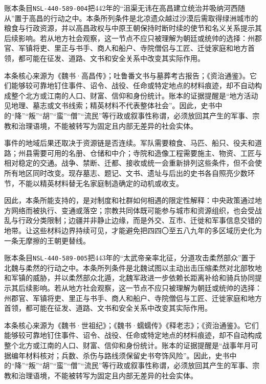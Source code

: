 账本条目\texttt{NSL-440-589-004}把442年的“沮渠无讳在高昌建立统治并吸纳河西随从”置于高昌的行动之中。本条所列条件是北凉遗众越过沙漠后需取得绿洲城市的粮食与行政资源，并以高昌政权与中原王朝保持时断时续的使节和名义关系提示其后续影响。若从地方社会观察，这一节点不应只被理解为朝廷或统帅的选择：州郡官、军镇将吏、里正与书手、商人和船户、寺院僧侣与工匠、迁徙家庭和地方首领，都可能在征发、道路、文书和安全关系中改变其实际作用。

本条核心来源为《魏书·高昌传》；吐鲁番文书与墓葬考古报告；《资治通鉴》。它们能够较可靠地钉住事件、诏令、战役、任命或特定地点的材料痕迹，却不自动构成整个北方或江南的人口、财富、信仰和身份统计。账本的证据提醒是“地方活动见地理、墓志或文书线索；精英材料不代表整体社会”。因此，史书中的“降”“叛”“胡”“蛮”“僧”“流民”等行政或叙事性称谓，必须放回其产生的军事、宗教和治理语境，不能被转写为固定且内部无差异的社会实体。

事件的地域后果还取决于资源链是否连续。军队需要粮食、马匹、船只、役夫和道路；州县需要可用的名册、仓储和中介；寺院和造像工程需要施主、物资、工匠与相对稳定的交通。战争、禁断、迁都、接收或统一会重新排列这些条件，但不会使所有地区同时改变。现存墓志、题记、文书、遗址与后出的史书各自照亮少数环节，不能以精英材料替无名家庭制造确定的动机或收支。

因此，本条所能支持的，是对制度和社群如何相遇的限定性解释：中央政策通过地方网络而被执行、变通或落空；宗教共同体既可能参与城市和资源组织，也会受战乱与行政分类限制；边疆并非静止边缘，而是外交、互市、迁徙和军事信息交错的地带。让这些材料边界持续可见，才能避免把四四〇至五八九年的多区域历史化为一条无摩擦的王朝更替线。

账本条目\texttt{NSL-440-589-005}把443年的“太武帝亲率北征，分道攻击柔然部众”置于北魏与柔然的行动之中。本条所列条件是北魏试图以主动出击压缩柔然对北部牧地和军镇的威胁，并以柔然部众北遁，北魏军政进一步依赖长距离补给和骑兵协同提示其后续影响。若从地方社会观察，这一节点不应只被理解为朝廷或统帅的选择：州郡官、军镇将吏、里正与书手、商人和船户、寺院僧侣与工匠、迁徙家庭和地方首领，都可能在征发、道路、文书和安全关系中改变其实际作用。

本条核心来源为《魏书·世祖纪》；《魏书·蠕蠕传》《释老志》；《资治通鉴》。它们能够较可靠地钉住事件、诏令、战役、任命或特定地点的材料痕迹，却不自动构成整个北方或江南的人口、财富、信仰和身份统计。账本的证据提醒是“战事年月可据编年材料核对；兵数、杀伤与路线须保留史书夸饰风险”。因此，史书中的“降”“叛”“胡”“蛮”“僧”“流民”等行政或叙事性称谓，必须放回其产生的军事、宗教和治理语境，不能被转写为固定且内部无差异的社会实体。

